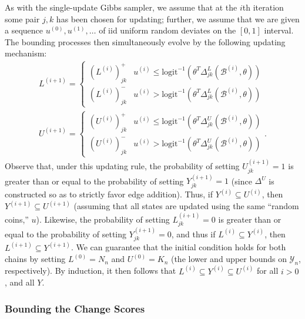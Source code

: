 \documentclass[11pt]{article}
\newcommand{\ilogit}{\ensuremath{\mathrm{logit}^{-1}}\xspace}
\begin{document}
As with the single-update Gibbs sampler, we assume that at the $i$th iteration some pair $j,k$ has been chosen for updating; further, we assume that we are given a sequence $u^{(0)}, u^{(1)}, \ldots$ of iid uniform random deviates on the $[0,1]$ interval.  The bounding processes then simultaneously evolve by the following updating mechanism:
\begin{gather}
L^{(i+1)} = \begin{cases}\left(L^{(i)}\right)^+_{jk} & u^{(i)} \le \ilogit\left(\theta^T \Delta^L_{jk}\left(\mathcal{B}^{(i)},\theta\right) \right) \\ \left(L^{(i)}\right)^-_{jk} & u^{(i)} > \ilogit\left(\theta^T \Delta^L_{jk}\left(\mathcal{B}^{(i)},\theta\right) \right) \end{cases}\\
U^{(i+1)} = \begin{cases}\left(U^{(i)}\right)^+_{jk} & u^{(i)} \le \ilogit\left(\theta^T \Delta^U_{jk}\left(\mathcal{B}^{(i)},\theta\right) \right)\\ \left(U^{(i)}\right)^-_{jk} & u^{(i)} > \ilogit\left(\theta^T \Delta^U_{jk}\left(\mathcal{B}^{(i)},\theta\right) \right)\end{cases}. \label{eq_upprobu}
\end{gather}
Observe that, under this updating rule, the probability of setting $U^{(i+1)}_{jk}=1$ is greater than or equal to the probability of setting $Y^{(i+1)}_{jk}=1$ (since $\Delta^U$ is constructed so as to strictly favor edge addition).  Thus, if $Y^{(i)}\subseteq U^{(i)}$, then $Y^{(i+1)}\subseteq U^{(i+1)}$ (assuming that all states are updated using the same ``random coins,'' $u$).  Likewise, the probability of setting $L^{(i+1)}_{jk}=0$ is greater than or equal to the probability of setting $Y^{(i+1)}_{jk}=0$, and thus if $L^{(i)}\subseteq Y^{(i)}$, then $L^{(i+1)}\subseteq Y^{(i+1)}$.  We can guarantee that the initial condition holds for both chains by setting $L^{(0)}=N_n$ and $U^{(0)}=K_n$ (the lower and upper bounds on $\mathcal{Y}_n$, respectively).  By induction, it then follows that $L^{(i)}\subseteq Y^{(i)}\subseteq U^{(i)}$ for all $i>0$, and all $Y$.

\subsubsection{Bounding the Change Scores}
\end{document}
